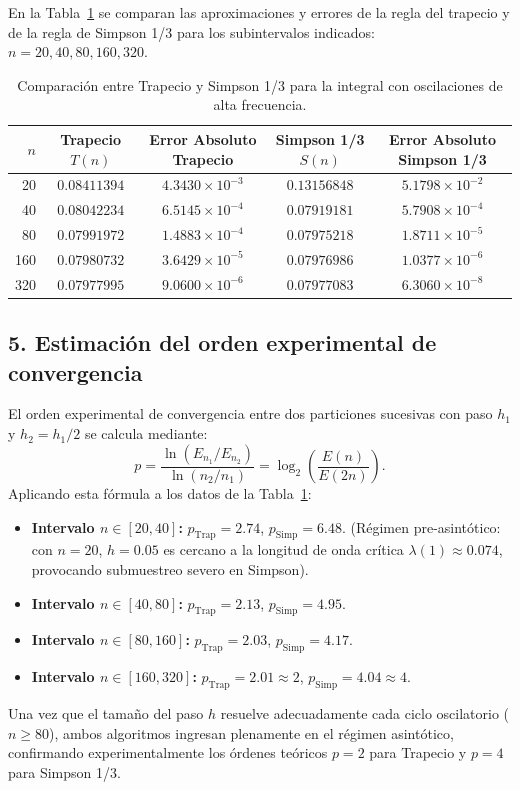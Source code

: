 \documentclass[11pt,a4paper]{article}
\begin{document}
En la Tabla~\ref{tab:ejercicio5} se comparan las aproximaciones y errores de la regla del trapecio y de la regla de Simpson 1/3 para los subintervalos indicados: $n = 20, 40, 80, 160, 320$.

\begin{table}[h!]
\centering
\caption{Comparación entre Trapecio y Simpson 1/3 para la integral con oscilaciones de alta frecuencia.}
\label{tab:ejercicio5}
\begin{tabular}{rcccc}
\toprule
$n$ & Trapecio $T(n)$ & Error Absoluto Trapecio & Simpson 1/3 $S(n)$ & Error Absoluto Simpson 1/3 \\
\midrule
20  & $0.08411394$ & $4.3430\times 10^{-3}$ & $0.13156848$ & $5.1798\times 10^{-2}$ \\
40  & $0.08042234$ & $6.5145\times 10^{-4}$ & $0.07919181$ & $5.7908\times 10^{-4}$ \\
80  & $0.07991972$ & $1.4883\times 10^{-4}$ & $0.07975218$ & $1.8711\times 10^{-5}$ \\
160 & $0.07980732$ & $3.6429\times 10^{-5}$ & $0.07976986$ & $1.0377\times 10^{-6}$ \\
320 & $0.07977995$ & $9.0600\times 10^{-6}$ & $0.07977083$ & $6.3060\times 10^{-8}$ \\
\bottomrule
\end{tabular}
\end{table}

\subsection{5. Estimación del orden experimental de convergencia}
El orden experimental de convergencia entre dos particiones sucesivas con paso $h_1$ y $h_2 = h_1 / 2$ se calcula mediante:
\begin{equation}
    p = \frac{\ln(E_{n_1} / E_{n_2})}{\ln(n_2 / n_1)} = \log_2\left( \frac{E(n)}{E(2n)} \right).
\end{equation}
Aplicando esta fórmula a los datos de la Tabla~\ref{tab:ejercicio5}:
\begin{itemize}
    \item \textbf{Intervalo $n \in [20, 40]$:} $p_{\text{Trap}} = 2.74$, \quad $p_{\text{Simp}} = 6.48$. (Régimen pre-asintótico: con $n=20$, $h = 0.05$ es cercano a la longitud de onda crítica $\lambda(1) \approx 0.074$, provocando submuestreo severo en Simpson).
    \item \textbf{Intervalo $n \in [40, 80]$:} $p_{\text{Trap}} = 2.13$, \quad $p_{\text{Simp}} = 4.95$.
    \item \textbf{Intervalo $n \in [80, 160]$:} $p_{\text{Trap}} = 2.03$, \quad $p_{\text{Simp}} = 4.17$.
    \item \textbf{Intervalo $n \in [160, 320]$:} $p_{\text{Trap}} = \mathbf{2.01} \approx 2$, \quad $p_{\text{Simp}} = \mathbf{4.04} \approx 4$.
\end{itemize}
Una vez que el tamaño del paso $h$ resuelve adecuadamente cada ciclo oscilatorio ($n \ge 80$), ambos algoritmos ingresan plenamente en el régimen asintótico, confirmando experimentalmente los órdenes teóricos $p=2$ para Trapecio y $p=4$ para Simpson 1/3.
\end{document}
